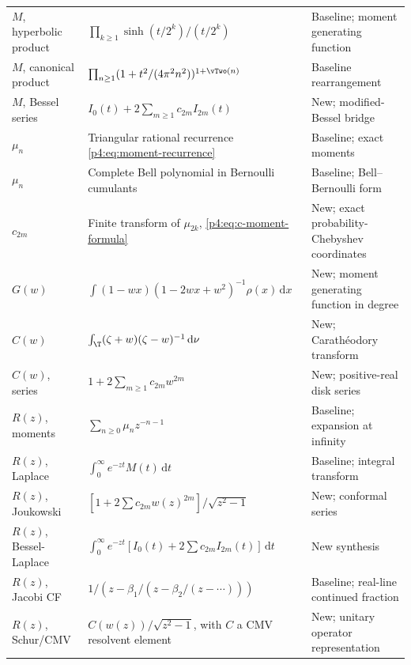 \documentclass[11pt,oneside]{article}
\theoremstyle{definition}
\newcommand{\dd}{\,\mathrm d}
\begin{document}
\begin{longtable}{p{}p{}p{}}
\(M\), hyperbolic product &
\(\prod_{k\ge1}\sinh(t/2^k)/(t/2^k)\) &
Baseline; moment generating function\\

\(M\), canonical product &
\(\prod_{n\ge1}(1+t^2/(4\pi^2n^2))^{1+\vTwo(n)}\) &
Baseline rearrangement\\

\(M\), Bessel series &
\(I_0(t)+2\sum_{m\ge1}c_{2m}I_{2m}(t)\) &
New; modified-Bessel bridge\\

\(\mu_n\) &
Triangular rational recurrence \eqref{p4:eq:moment-recurrence} &
Baseline; exact moments\\

\(\mu_n\) &
Complete Bell polynomial in Bernoulli cumulants &
Baseline; Bell--Bernoulli form\\

\(c_{2m}\) &
Finite transform of \(\mu_{2k}\), \eqref{p4:eq:c-moment-formula} &
New; exact probability-Chebyshev coordinates\\

\(G(w)\) &
\(\int(1-wx)(1-2wx+w^2)^{-1}\rho(x)\dd x\) &
New; moment generating function in degree\\

\(C(w)\) &
\(\int_{\T}(\zeta+w)(\zeta-w)^{-1}\dd\nu\) &
New; Carath\'eodory transform\\

\(C(w)\), series &
\(1+2\sum_{m\ge1}c_{2m}w^{2m}\) &
New; positive-real disk series\\

\(R(z)\), moments &
\(\sum_{n\ge0}\mu_nz^{-n-1}\) &
Baseline; expansion at infinity\\

\(R(z)\), Laplace &
\(\int_0^\infty e^{-zt}M(t)\dd t\) &
Baseline; integral transform\\

\(R(z)\), Joukowski &
\([1+2\sum c_{2m}w(z)^{2m}]/\sqrt{z^2-1}\) &
New; conformal series\\

\(R(z)\), Bessel-Laplace &
\(\int_0^\infty e^{-zt}[I_0(t)+2\sum c_{2m}I_{2m}(t)]\dd t\) &
New synthesis\\

\(R(z)\), Jacobi CF &
\(1/(z-\beta_1/(z-\beta_2/(z-\cdots)))\) &
Baseline; real-line continued fraction\\

\(R(z)\), Schur/CMV &
\(C(w(z))/\sqrt{z^2-1}\), with \(C\) a CMV resolvent element &
New; unitary operator representation\\


\end{longtable}
\end{document}
